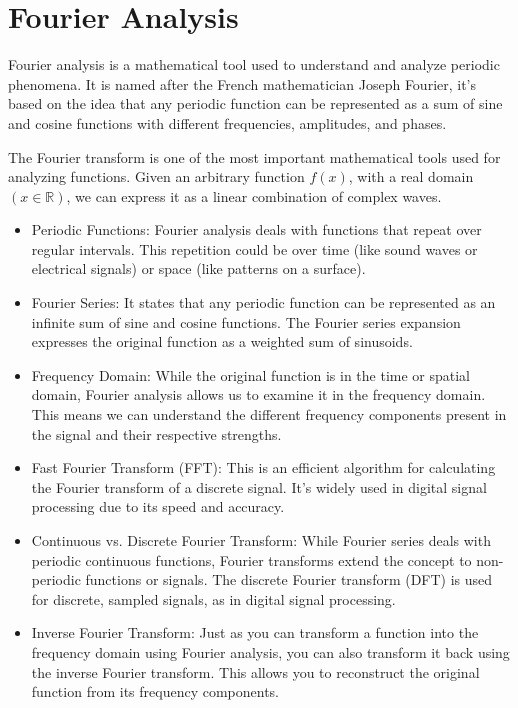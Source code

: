 \chapter{Fourier Analysis}

Fourier analysis is a mathematical tool used to understand and analyze periodic phenomena. It is named after the French mathematician Joseph Fourier, it's based on the idea that any periodic function can be represented as a sum of sine and cosine functions with different frequencies, amplitudes, and phases.

The Fourier transform is one of the most important mathematical tools used for analyzing functions. Given an arbitrary function $f(x)$, with a real domain $(x \in \mathbb{R})$, we can express it as a linear combination of complex waves. 

\begin{itemize}
	\item Periodic Functions: Fourier analysis deals with functions that repeat over regular intervals. This repetition could be over time (like sound waves or electrical signals) or space (like patterns on a surface).
	\item Fourier Series: It states that any periodic function can be represented as an infinite sum of sine and cosine functions. The Fourier series expansion expresses the original function as a weighted sum of sinusoids.
	\item Frequency Domain: While the original function is in the time or spatial domain, Fourier analysis allows us to examine it in the frequency domain. This means we can understand the different frequency components present in the signal and their respective strengths.
	\item Fast Fourier Transform (FFT): This is an efficient algorithm for calculating the Fourier transform of a discrete signal. It's widely used in digital signal processing due to its speed and accuracy.
	\item Continuous vs. Discrete Fourier Transform: While Fourier series deals with periodic continuous functions, Fourier transforms extend the concept to non-periodic functions or signals. The discrete Fourier transform (DFT) is used for discrete, sampled signals, as in digital signal processing.
	\item Inverse Fourier Transform: Just as you can transform a function into the frequency domain using Fourier analysis, you can also transform it back using the inverse Fourier transform. This allows you to reconstruct the original function from its frequency components.
\end{itemize}



